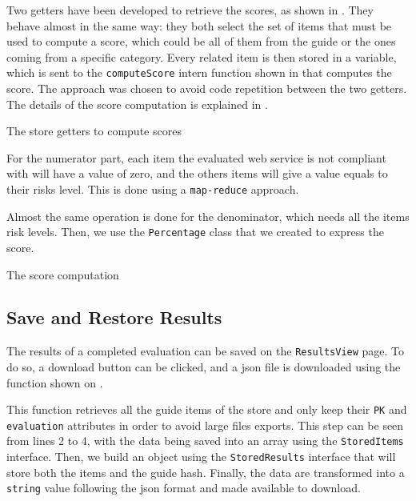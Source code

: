 Two getters have been developed to retrieve the scores, as shown in . They behave almost in the same way: they both select the set of items that must be used to compute a score, which could be all of them from the guide or the ones coming from a specific category. Every related item is then stored in a variable, which is sent to the \texttt{computeScore} intern function shown in  that computes the score. The approach was chosen to avoid code repetition between the two getters. The details of the score computation is explained in .

\begin{listing}[!ht] 
	\caption{The store getters to compute scores}
	\label{lst:app_implementation_results_getters}
\end{listing}

For the numerator part, each item the evaluated web service is not compliant with will have a value of zero, and the others items will give a value equals to their risks level. This is done using a \texttt{map-reduce} approach.

Almost the same operation is done for the denominator, which needs all the items risk levels. Then, we use the \texttt{Percentage} class that we created to express the score.

\begin{listing}[!ht] 
	\caption{The score computation}
	\label{lst:app_implementation_results_computation}
\end{listing}

\subsection{Save and Restore Results}
\label{subsec:app_implementation_restore}

The results of a completed evaluation can be saved on the \texttt{ResultsView} page. To do so, a download button can be clicked, and a \gls{json} file is downloaded using the function shown on . 

This function retrieves all the guide items of the store and only keep their \texttt{PK} and \texttt{evaluation} attributes in order to avoid large files exports. This step can be seen from lines 2 to 4, with the data being saved into an array using the \texttt{StoredItems} interface. Then, we build an object using the \texttt{StoredResults} interface that will store both the items and the guide hash. Finally, the data are transformed into a \texttt{string} value following the \gls{json} format and made available to download.

